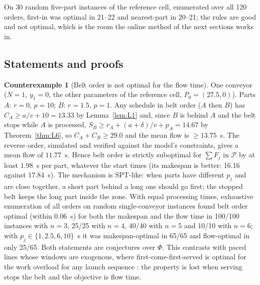\documentclass[11pt,a4paper]{article}
\theoremstyle{plain}
\theoremstyle{definition}
\newtheorem{counterexample}{Counterexample}
\theoremstyle{remark}
\newcommand{\Pb}{\mathcal{P}}
\begin{document}
On 30 random five-part instances of the reference cell, enumerated over all 120 orders,
first-in was optimal in 21--22 and nearest-part in 20--21; the rules are good and not
optimal, which is the room the online method of the next sections works in.

\subsection{Statements and proofs}
\begin{counterexample}[Belt order is not optimal for the flow time]\label{cex:single}
One conveyor ($N=1$, $y_1=0$, the other parameters of the reference cell,
$P_0=(27.5,0)$). Parts $A$: $r=0$, $p=10$; $B$: $r=1.5$, $p=1$. Any schedule in belt order
($A$ then $B$) has $C_A\ge a/v+10=13.33$ by Lemma~\ref{lem:L1} and, since $B$ is behind $A$
and the belt stops while $A$ is processed, $S_B\ge r_A+(a+\delta)/v+p_A=14.67$ by
Theorem~\ref{thm:L6}, so $C_A+C_B\ge29.0$ and the mean flow is $\ge13.75$~s. The reverse
order, simulated and verified against the model's constraints, gives a mean flow of
$11.77$~s. Hence belt order is strictly suboptimal for $\sum F_j$ in $\Pb$ by at least
$1.98$~s per part, whatever the start times (its makespan is better: 16.16 against
17.84~s). The mechanism is SPT-like: when parts have different $p_j$ and are close
together, a short part behind a long one should go first; the stopped belt keeps the long
part inside the zone. With equal processing times, exhaustive enumeration of all orders
on random single-conveyor instances found belt order optimal (within 0.06~s) for both the
makespan and the flow time in 100/100 instances with $n=3$, 25/25 with $n=4$, 40/40 with
$n=5$ and 10/10 with $n=6$; with $p_j\in\{1,2.5,6,10\}$~s it was makespan-optimal in 65/65
and flow-optimal in only 25/65. Both statements are conjectures over $\Phi$. This contrasts with
paced lines whose windows are exogenous, where first-come-first-served is optimal for the
work overload for any launch sequence \cite{Yano1991}: the property is lost when serving
stops the belt and the objective is flow time.
\end{counterexample}
\end{document}
